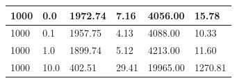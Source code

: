 \documentclass[12pt,a4paper]{report}
\begin{document}
\begin{table}[htbp]
\begin{tabular}{|l|l|l|l|l|l|}
1000                                                                                            & 0.0                                                                                                                    & 1972.74                                                                                                                                    & 7.16                                                                                                                              & 4056.00                                                                                               & 15.78                                                                                                                                   \\ \hline
1000                                                                                            & 0.1                                                                                                                    & 1957.75                                                                                                                                    & 4.13                                                                                                                              & 4088.00                                                                                               & 10.33                                                                                                                                   \\ \hline
1000                                                                                            & 1.0                                                                                                                    & 1899.74                                                                                                                                    & 5.12                                                                                                                              & 4213.00                                                                                               & 11.60                                                                                                                                   \\ \hline
1000                                                                                            & 10.0                                                                                                                   & 402.51                                                                                                                                     & 29.41                                                                                                                             & 19965.00                                                                                              & 1270.81                                                                                                                                 \\ \hline

\end{tabular}
\end{table}
\end{document}
